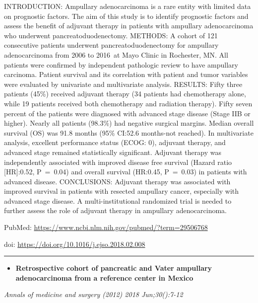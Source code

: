 \documentclass[]{article}
\providecommand{\tightlist}{%
  \setlength{\itemsep}{0pt}\setlength{\parskip}{0pt}}
\begin{document}
INTRODUCTION: Ampullary adenocarcinoma is a rare entity with limited
data on prognostic factors. The aim of this study is to identify
prognostic factors and assess the benefit of adjuvant therapy in
patients with ampullary adenocarcinoma who underwent
pancreatoduodenectomy. METHODS: A cohort of 121 consecutive patients
underwent pancreatoduodenectomy for ampullary adenocarcinoma from 2006
to 2016~at Mayo Clinic in Rochester, MN. All patients were confirmed by
independent pathologic review to have ampullary carcinoma. Patient
survival and its correlation with patient and tumor variables were
evaluated by univariate and multivariate analysis. RESULTS: Fifty three
patients (45\%) received adjuvant therapy (34 patients had chemotherapy
alone, while 19 patients received both chemotherapy and radiation
therapy). Fifty seven percent of the patients were diagnosed with
advanced stage disease (Stage IIB or higher). Nearly all patients
(98.3\%) had negative surgical margins. Median overall survival (OS) was
91.8 months (95\% CI:52.6 months-not reached). In multivariate analysis,
excellent performance status (ECOG: 0), adjuvant therapy, and advanced
stage remained statistically significant. Adjuvant therapy was
independently associated with improved disease free survival (Hazard
ratio {[}HR{]}:0.52, P~=~0.04) and overall survival (HR:0.45, P~=~0.03)
in patients with advanced disease. CONCLUSIONS: Adjuvant therapy was
associated with improved survival in patients with resected ampullary
cancer, especially with advanced stage disease. A multi-institutional
randomized trial is needed to further assess the role of adjuvant
therapy in ampullary adenocarcinoma.

PubMed: \url{https://www.ncbi.nlm.nih.gov/pubmed/?term=29506768}

doi: \url{https://doi.org/10.1016/j.ejso.2018.02.008}

{}

{}

\begin{center}\rule{0.5\linewidth}{\linethickness}\end{center}

\begin{itemize}
\tightlist
\item
  \textbf{Retrospective cohort of pancreatic and Vater ampullary
  adenocarcinoma from a reference center in Mexico}
\end{itemize}

\emph{Annals of medicine and surgery (2012) 2018 Jun;30():7-12}
\end{document}
